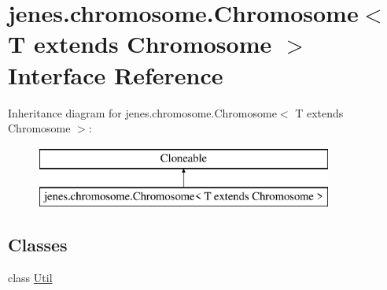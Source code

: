 \hypertarget{interfacejenes_1_1chromosome_1_1_chromosome_3_01_t_01extends_01_chromosome_01_4}{\section{jenes.\-chromosome.\-Chromosome$<$ T extends Chromosome $>$ Interface Reference}
\label{interfacejenes_1_1chromosome_1_1_chromosome_3_01_t_01extends_01_chromosome_01_4}
}
Inheritance diagram for jenes.\-chromosome.\-Chromosome$<$ T extends Chromosome $>$\-:\begin{figure}[H]
\begin{center}
\leavevmode
\includegraphics[height=2.000000cm]{interfacejenes_1_1chromosome_1_1_chromosome_3_01_t_01extends_01_chromosome_01_4}
\end{center}
\end{figure}
\subsection*{Classes}
\begin{DoxyCompactItemize}
\item 
class \hyperlink{classjenes_1_1chromosome_1_1_chromosome_3_01_t_01extends_01_chromosome_01_4_1_1_util}{Util}
\end{DoxyCompactItemize}
